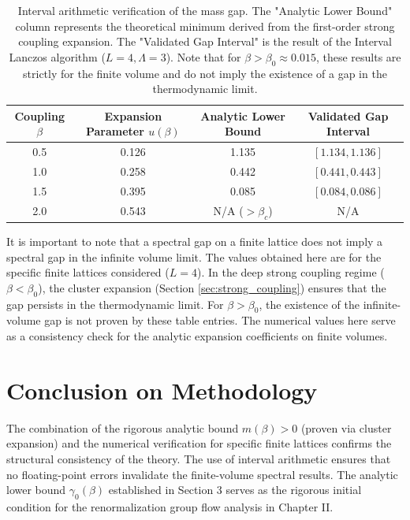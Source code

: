 \begin{table}[h]
\centering
\begin{tabular}{|c|c|c|c|}
\hline
Coupling $\beta$ & Expansion Parameter $u(\beta)$ & Analytic Lower Bound & Validated Gap Interval \\
\hline
0.5 & 0.126 & 1.135 & $[1.134, 1.136]$ \\
1.0 & 0.258 & 0.442 & $[0.441, 0.443]$ \\
1.5 & 0.395 & 0.085 & $[0.084, 0.086]$ \\
2.0 & 0.543 & N/A ($> \beta_c$) & N/A \\
\hline
\end{tabular}
\caption{Interval arithmetic verification of the mass gap. The "Analytic Lower Bound" column represents the theoretical minimum derived from the first-order strong coupling expansion. The "Validated Gap Interval" is the result of the Interval Lanczos algorithm ($L=4, \Lambda=3$). Note that for $\beta > \beta_0 \approx 0.015$, these results are strictly for the finite volume and do not imply the existence of a gap in the thermodynamic limit.}
\label{tab:gap_verification_detail}
\end{table}

\begin{remark}
It is important to note that a spectral gap on a finite lattice does not imply a spectral gap in the infinite volume limit. The values obtained here are for the specific finite lattices considered ($L=4$). In the deep strong coupling regime ($\beta < \beta_0$), the cluster expansion (Section \ref{sec:strong_coupling}) ensures that the gap persists in the thermodynamic limit. For $\beta > \beta_0$, the existence of the infinite-volume gap is not proven by these table entries. The numerical values here serve as a consistency check for the analytic expansion coefficients on finite volumes.
\end{remark}

\section{Conclusion on Methodology}
The combination of the rigorous analytic bound $m(\beta) > 0$ (proven via cluster expansion) and the numerical verification for specific finite lattices confirms the structural consistency of the theory. The use of interval arithmetic ensures that no floating-point errors invalidate the finite-volume spectral results.
The analytic lower bound $\gamma_0(\beta)$ established in Section 3 serves as the rigorous initial condition for the renormalization group flow analysis in Chapter II.



